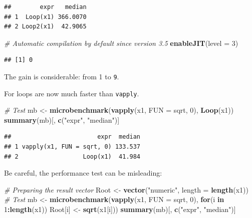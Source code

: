 \documentclass[
  12pt,
  american,
  a4paper,
  extrafontsizes,onecolumn,openright
  ]{memoir}
\newenvironment{Shaded}{\begin{snugshade}}{\end{snugshade}}
\newcommand{\AttributeTok}[1]{\textcolor[rgb]{0.13,0.29,0.53}{#1}}
\newcommand{\CommentTok}[1]{\textcolor[rgb]{0.56,0.35,0.01}{\textit{#1}}}
\newcommand{\ControlFlowTok}[1]{\textcolor[rgb]{0.13,0.29,0.53}{\textbf{#1}}}
\newcommand{\DecValTok}[1]{\textcolor[rgb]{0.00,0.00,0.81}{#1}}
\newcommand{\FunctionTok}[1]{\textcolor[rgb]{0.13,0.29,0.53}{\textbf{#1}}}
\newcommand{\NormalTok}[1]{#1}
\newcommand{\OtherTok}[1]{\textcolor[rgb]{0.56,0.35,0.01}{#1}}
\newcommand{\SpecialCharTok}[1]{\textcolor[rgb]{0.81,0.36,0.00}{\textbf{#1}}}
\newcommand{\StringTok}[1]{\textcolor[rgb]{0.31,0.60,0.02}{#1}}
\newlength{\rf}
\begin{document}
\begin{verbatim}
##        expr   median
## 1  Loop(x1) 366.0070
## 2 Loop2(x1)  42.9065
\end{verbatim}

\begin{Shaded}
\begin{Highlighting}[]
\CommentTok{\# Automatic compilation by default since version 3.5}
\FunctionTok{enableJIT}\NormalTok{(}\AttributeTok{level =} \DecValTok{3}\NormalTok{)}
\end{Highlighting}
\end{Shaded}

\begin{verbatim}
## [1] 0
\end{verbatim}

\normalsize

The gain is considerable: from 1 to \texttt{9}.

For loops are now much faster than \texttt{vapply}.

\scriptsize

\begin{Shaded}
\begin{Highlighting}[]
\CommentTok{\# Test}
\NormalTok{mb }\OtherTok{\textless{}{-}} \FunctionTok{microbenchmark}\NormalTok{(}\FunctionTok{vapply}\NormalTok{(x1, }\AttributeTok{FUN =}\NormalTok{ sqrt, }\DecValTok{0}\NormalTok{), }\FunctionTok{Loop}\NormalTok{(x1))}
\FunctionTok{summary}\NormalTok{(mb)[, }\FunctionTok{c}\NormalTok{(}\StringTok{"expr"}\NormalTok{, }\StringTok{"median"}\NormalTok{)]}
\end{Highlighting}
\end{Shaded}

\begin{verbatim}
##                        expr  median
## 1 vapply(x1, FUN = sqrt, 0) 133.537
## 2                  Loop(x1)  41.984
\end{verbatim}

\normalsize

Be careful, the performance test can be misleading:

\scriptsize

\begin{Shaded}
\begin{Highlighting}[]
\CommentTok{\# Preparing the result vector}
\NormalTok{Root }\OtherTok{\textless{}{-}} \FunctionTok{vector}\NormalTok{(}\StringTok{"numeric"}\NormalTok{, }\AttributeTok{length =} \FunctionTok{length}\NormalTok{(x1))}
\CommentTok{\# Test}
\NormalTok{mb }\OtherTok{\textless{}{-}} \FunctionTok{microbenchmark}\NormalTok{(}\FunctionTok{vapply}\NormalTok{(x1, }\AttributeTok{FUN =}\NormalTok{ sqrt, }\DecValTok{0}\NormalTok{), }
                     \ControlFlowTok{for}\NormalTok{(i }\ControlFlowTok{in} \DecValTok{1}\SpecialCharTok{:}\FunctionTok{length}\NormalTok{(x1)) }
\NormalTok{                       Root[i] }\OtherTok{\textless{}{-}} \FunctionTok{sqrt}\NormalTok{(x1[i]))}
\FunctionTok{summary}\NormalTok{(mb)[, }\FunctionTok{c}\NormalTok{(}\StringTok{"expr"}\NormalTok{, }\StringTok{"median"}\NormalTok{)]}
\end{Highlighting}
\end{Shaded}
\end{document}
